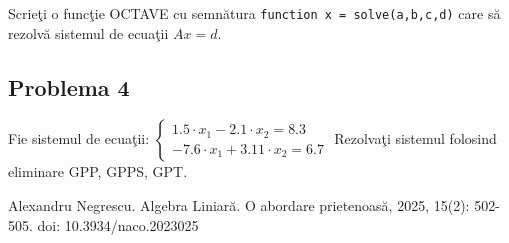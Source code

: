 \documentclass{exam}
\begin{document}
Scrie\c{t}i o func\c{t}ie OCTAVE cu semn\u{a}tura \verb|function x = solve(a,b,c,d)| care s\u{a} rezolv\u{a} sistemul de ecua\c{t}ii $Ax = d$.


\subsection{Problema 4}
Fie sistemul de ecua\c{t}ii:
$\displaystyle
	\begin{cases} 1.5 \cdot x_1 - 2.1 \cdot x_2 = 8.3 \\
		-7.6 \cdot x_1 + 3.11 \cdot x_2 = 6.7
	\end{cases}$
Rezolva\c{t}i sistemul folosind eliminare GPP, GPPS, GPT.

\begin{thebibliography}{1}

	Alexandru Negrescu. Algebra Liniară. O abordare prietenoasă, 2025, 15(2): 502-505. doi: 10.3934/naco.2023025

\end{thebibliography}
\end{document}
